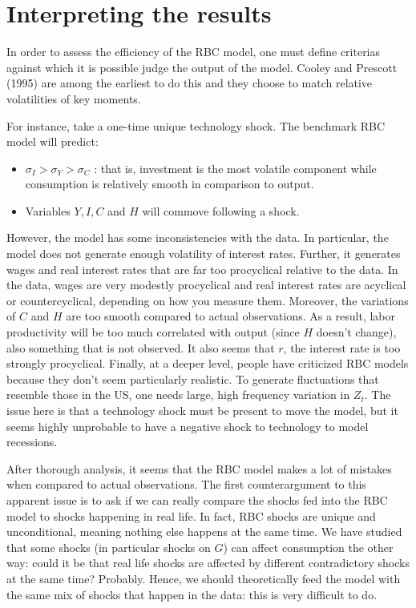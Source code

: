 \documentclass[12pt]{report}
\begin{document}
\section{Interpreting the results}

In order to assess the efficiency of the RBC model, one must define criterias against which it is possible judge the output of the model. Cooley and Prescott (1995) are among the earliest to do this and they choose to match relative volatilities of key moments.

For instance, take a one-time unique technology shock. The benchmark RBC model will predict:\begin{itemize}
\item $\sigma_I > \sigma_Y > \sigma_C$ : that is, investment is the most volatile component while consumption is relatively smooth in comparison to output.
\item Variables $Y, I, C$ and $H$ will commove following a shock.
\end{itemize}

However, the model has some inconsistencies with the data. In particular, the model does not generate enough  volatility  of  interest rates.  Further, it generates wages and real interest rates that are far too procyclical relative to the data.  In the data, wages are very modestly procyclical and real interest rates are acyclical or countercyclical, depending on how you measure them. Moreover, the variations of $C$ and $H$ are too smooth compared to actual observations. As a result, labor productivity will be too much correlated with output (since $H$ doesn't change), also something that is not observed. It also seems that $r$, the interest rate is too strongly procyclical. Finally, at a deeper level, people have criticized RBC models because they don’t seem particularly
realistic.  To generate fluctuations that resemble those in the US, one needs large, high frequency
variation in $Z_t$. The issue here is that a technology shock must be present to move the model, but it seems highly unprobable to have a negative shock to technology to model recessions.

After thorough analysis, it seems that the RBC model makes a lot of mistakes when compared to actual observations. The first counterargument to this apparent issue is to ask if we can really compare the shocks fed into the RBC model to shocks happening in real life. In fact, RBC shocks are unique and unconditional, meaning nothing else happens at the same time. We have studied that some shocks (in particular shocks on $G$) can affect consumption the other way: could it be that real life shocks are affected by different contradictory shocks at the same time? Probably. Hence, we should theoretically feed the model with the same mix of shocks that happen in the data: this is very difficult to do.
\end{document}
